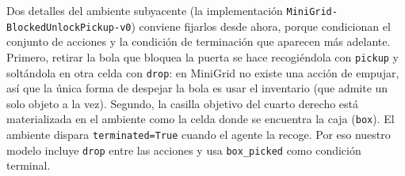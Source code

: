 \documentclass[11pt,a4paper]{article}
\begin{document}
Dos detalles del ambiente subyacente (la implementación
\texttt{MiniGrid-BlockedUnlockPickup-v0}) conviene fijarlos desde ahora,
porque condicionan el conjunto de acciones y la condición de terminación
que aparecen más adelante. Primero, retirar la bola que bloquea la puerta
se hace recogiéndola con \texttt{pickup} y soltándola en otra celda con
\texttt{drop}: en MiniGrid no existe una acción de empujar, así que la
única forma de despejar la bola es usar el inventario (que admite un solo
objeto a la vez). Segundo, la casilla objetivo del cuarto derecho está
materializada en el ambiente como la celda donde se encuentra la caja
(\texttt{box}). El ambiente dispara \texttt{terminated=True} cuando el
agente la recoge. Por eso nuestro modelo incluye \texttt{drop} entre las
acciones y usa \texttt{box\_picked} como condición terminal.
\end{document}
